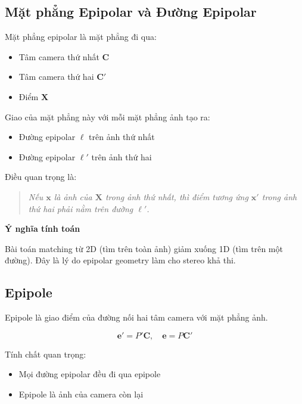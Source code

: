 \subsection{Mặt phẳng Epipolar và Đường Epipolar}
\label{subsec:epipolar_plane}

Mặt phẳng epipolar là mặt phẳng đi qua:
\begin{itemize}
	\item Tâm camera thứ nhất $\mathbf{C}$
	\item Tâm camera thứ hai $\mathbf{C}'$
	\item Điểm $\mathbf{X}$
\end{itemize}

Giao của mặt phẳng này với mỗi mặt phẳng ảnh tạo ra:
\begin{itemize}
	\item Đường epipolar $\ell$ trên ảnh thứ nhất
	\item Đường epipolar $\ell'$ trên ảnh thứ hai
\end{itemize}

Điều quan trọng là:

\begin{quote}
	\textit{Nếu $\mathbf{x}$ là ảnh của $\mathbf{X}$ trong ảnh thứ nhất, thì điểm tương ứng $\mathbf{x}'$ trong ảnh thứ hai phải nằm trên đường $\ell'$.}
\end{quote}

\begin{mdframed}[style=infobox]
	\textbf{Ý nghĩa tính toán}
	
	Bài toán matching từ 2D (tìm trên toàn ảnh) giảm xuống 1D (tìm trên một đường). Đây là lý do epipolar geometry làm cho stereo khả thi.
\end{mdframed}

\subsection{Epipole}
\label{subsec:epipole}

Epipole là giao điểm của đường nối hai tâm camera với mặt phẳng ảnh.

\[
\mathbf{e}' = P'\mathbf{C}, \quad \mathbf{e} = P\mathbf{C}'
\]

Tính chất quan trọng:

\begin{itemize}
	\item Mọi đường epipolar đều đi qua epipole
	\item Epipole là ảnh của camera còn lại
\end{itemize}

